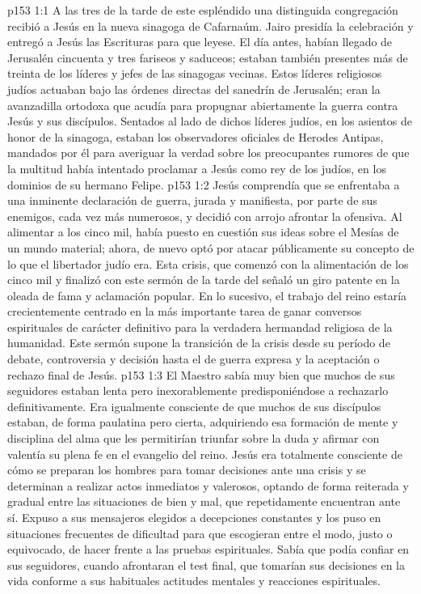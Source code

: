 \vs p153 1:1 A las tres de la tarde de este espléndido  una distinguida congregación recibió a Jesús en la nueva sinagoga de Cafarnaúm. Jairo presidía la celebración y entregó a Jesús las Escrituras para que leyese. El día antes, habían llegado de Jerusalén cincuenta y tres fariseos y saduceos; estaban también presentes más de treinta de los líderes y jefes de las sinagogas vecinas. Estos líderes religiosos judíos actuaban bajo las órdenes directas del sanedrín de Jerusalén; eran la avanzadilla ortodoxa que acudía para propugnar abiertamente la guerra contra Jesús y sus discípulos. Sentados al lado de dichos líderes judíos, en los asientos de honor de la sinagoga, estaban los observadores oficiales de Herodes Antipas, mandados por él para averiguar la verdad sobre los preocupantes rumores de que la multitud había intentado proclamar a Jesús como rey de los judíos, en los dominios de su hermano Felipe.
\vs p153 1:2 Jesús comprendía que se enfrentaba a una inminente declaración de guerra, jurada y manifiesta, por parte de sus enemigos, cada vez más numerosos, y decidió con arrojo afrontar la ofensiva. Al alimentar a los cinco mil, había puesto en cuestión sus ideas sobre el Mesías de un mundo material; ahora, de nuevo optó por atacar públicamente su concepto de lo que el libertador judío era. Esta crisis, que comenzó con la alimentación de los cinco mil y finalizó con este sermón de la tarde del  señaló un giro patente en la oleada de fama y aclamación popular. En lo sucesivo, el trabajo del reino estaría crecientemente centrado en la más importante tarea de ganar conversos espirituales de carácter definitivo para la verdadera hermandad religiosa de la humanidad. Este sermón supone la transición de la crisis desde su período de debate, controversia y decisión hasta el de guerra expresa y la aceptación o rechazo final de Jesús.
\vs p153 1:3 El Maestro sabía muy bien que muchos de sus seguidores estaban lenta pero inexorablemente predisponiéndose a rechazarlo definitivamente. Era igualmente consciente de que muchos de sus discípulos estaban, de forma paulatina pero cierta, adquiriendo esa formación de mente y disciplina del alma que les permitirían triunfar sobre la duda y afirmar con valentía su plena fe en el evangelio del reino. Jesús era totalmente consciente de cómo se preparan los hombres para tomar decisiones ante una crisis y se determinan a realizar actos inmediatos y valerosos, optando de forma reiterada y gradual entre las situaciones de bien y mal, que repetidamente encuentran ante sí. Expuso a sus mensajeros elegidos a decepciones constantes y los puso en situaciones frecuentes de dificultad para que escogieran entre el modo, justo o equivocado, de hacer frente a las pruebas espirituales. Sabía que podía confiar en sus seguidores, cuando afrontaran el test final, que tomarían sus decisiones en la vida conforme a sus habituales actitudes mentales y reacciones espirituales.

